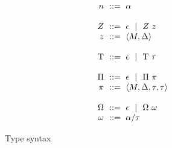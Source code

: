 \documentclass[acmsmall]{acmart}
\theoremstyle{definition}
\begin{document}
\begin{figure*}[h]
\[\begin{array}[t]{r@{}l}
    \nonterm{n} & \is \alpha
    \\
    \\
    \nonterm{Z} & \is \epsilon \sep Z\ z
    \\
    \nonterm{z} & \is \left< M, \Delta \right>
    \\
    \\
    \nonterm{\mathrm{T}} & \is \epsilon \sep \mathrm{T}\ \tau
    \\
    \\
    \nonterm{\mathrm{\Pi}} & \is \epsilon \sep \Pi\ \pi
    \\
    \nonterm{\pi} & \is \left< M, \Delta, \tau, \tau\right>
    \\
    \\
    \nonterm{\Omega} & \is \epsilon \sep \Omega\ \omega
    \\  
    \nonterm{\omega} & \is \alpha \slash \tau
  \end{array}\]
  \caption{Type syntax}
  \label{fig:type_syntax}
\end{figure*}
\end{document}
